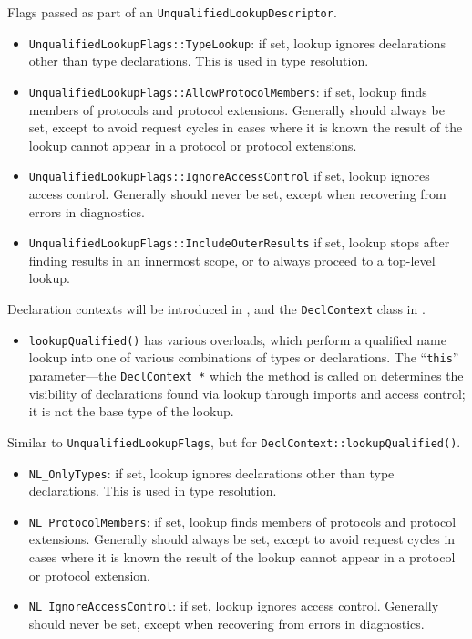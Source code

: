 \documentclass[../generics]{subfiles}
\begin{document}
Flags passed as part of an \texttt{UnqualifiedLookupDescriptor}.
\begin{itemize}
\item \texttt{UnqualifiedLookupFlags::TypeLookup}: if set, lookup ignores declarations other than type declarations. This is used in type resolution.
\item \texttt{UnqualifiedLookupFlags::AllowProtocolMembers}: if set, lookup finds members of protocols and protocol extensions. Generally should always be set, except to avoid request cycles in cases where it is known the result of the lookup cannot appear in a protocol or protocol extensions.
\item \texttt{UnqualifiedLookupFlags::IgnoreAccessControl} if set, lookup ignores access control. Generally should never be set, except when recovering from errors in diagnostics.
\item \texttt{UnqualifiedLookupFlags::IncludeOuterResults} if set, lookup stops after finding results in an innermost scope, or to always proceed to a top-level lookup.
\end{itemize}

Declaration contexts will be introduced in , and the \texttt{DeclContext} class in .
\begin{itemize}
\item \texttt{lookupQualified()} has various overloads, which perform a qualified name lookup into one of various combinations of types or declarations. The ``\texttt{this}'' parameter---the \texttt{DeclContext~*} which the method is called on determines the visibility of declarations found via lookup through imports and access control; it is not the base type of the lookup.
\end{itemize}

Similar to \texttt{UnqualifiedLookupFlags}, but for \texttt{DeclContext::lookupQualified()}.
\begin{itemize}
\item \verb|NL_OnlyTypes|: if set, lookup ignores declarations other than type declarations. This is used in type resolution.
\item \verb|NL_ProtocolMembers|: if set, lookup finds members of protocols and protocol extensions. Generally should always be set, except to avoid request cycles in cases where it is known the result of the lookup cannot appear in a protocol or protocol extension.
\item \verb|NL_IgnoreAccessControl|: if set, lookup ignores access control. Generally should never be set, except when recovering from errors in diagnostics.
\end{itemize}
\end{document}
